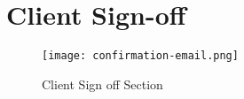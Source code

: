 \chapter{Client Sign-off}
\label{appendix:client-sign-off}

\begin{figure}[!hbt]
  	\centering
 	\texttt{[image: confirmation-email.png]}
 	\caption{Client Sign off Section}
\end{figure}